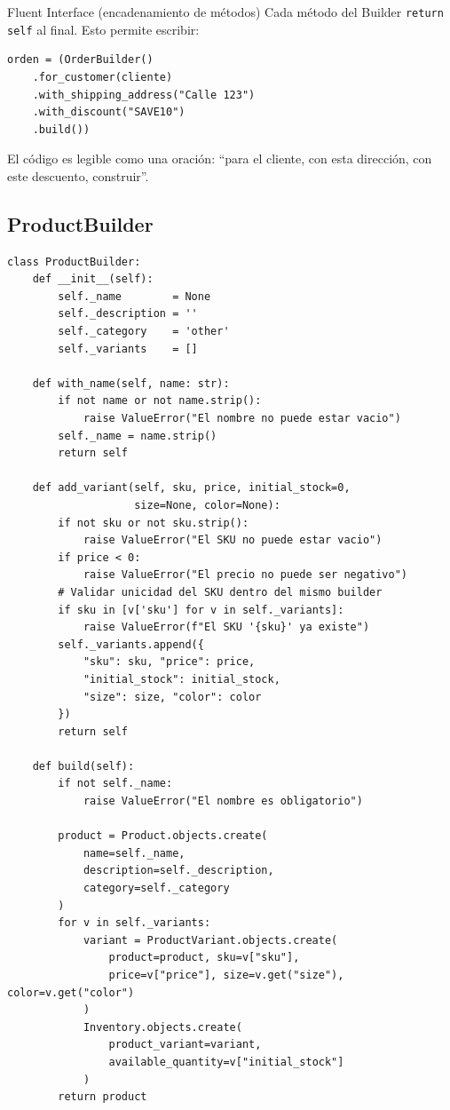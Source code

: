 \documentclass[12pt, a4paper]{article}
\begin{document}
\begin{tipbox}{Fluent Interface (encadenamiento de métodos)}
Cada método del Builder \texttt{return self} al final. Esto permite escribir:
\begin{verbatim}
orden = (OrderBuilder()
    .for_customer(cliente)
    .with_shipping_address("Calle 123")
    .with_discount("SAVE10")
    .build())
\end{verbatim}
El código es legible como una oración: ``para el cliente, con esta
dirección, con este descuento, construir''.
\end{tipbox}

\subsection{ProductBuilder}

\begin{lstlisting}[caption={products/domain/builders.py -- ProductBuilder}]
class ProductBuilder:
    def __init__(self):
        self._name        = None
        self._description = ''
        self._category    = 'other'
        self._variants    = []

    def with_name(self, name: str):
        if not name or not name.strip():
            raise ValueError("El nombre no puede estar vacio")
        self._name = name.strip()
        return self

    def add_variant(self, sku, price, initial_stock=0,
                    size=None, color=None):
        if not sku or not sku.strip():
            raise ValueError("El SKU no puede estar vacio")
        if price < 0:
            raise ValueError("El precio no puede ser negativo")
        # Validar unicidad del SKU dentro del mismo builder
        if sku in [v['sku'] for v in self._variants]:
            raise ValueError(f"El SKU '{sku}' ya existe")
        self._variants.append({
            "sku": sku, "price": price,
            "initial_stock": initial_stock,
            "size": size, "color": color
        })
        return self

    def build(self):
        if not self._name:
            raise ValueError("El nombre es obligatorio")

        product = Product.objects.create(
            name=self._name,
            description=self._description,
            category=self._category
        )
        for v in self._variants:
            variant = ProductVariant.objects.create(
                product=product, sku=v["sku"],
                price=v["price"], size=v.get("size"), color=v.get("color")
            )
            Inventory.objects.create(
                product_variant=variant,
                available_quantity=v["initial_stock"]
            )
        return product
\end{lstlisting}
\end{document}
